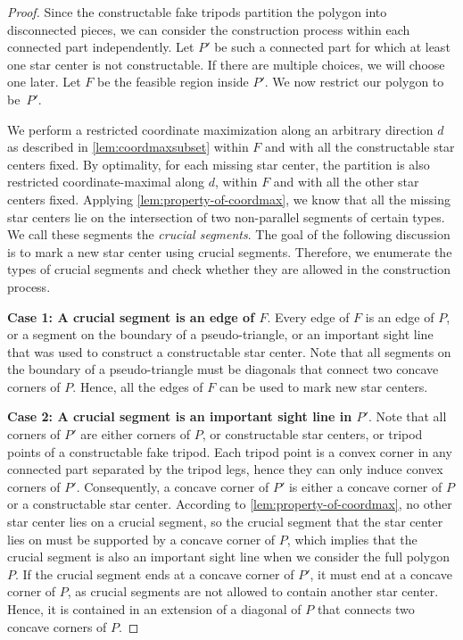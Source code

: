 \documentclass[10pt,a4paper]{article}
\begin{document}
\begin{proof}
Since the constructable fake tripods partition the polygon into disconnected pieces, we can consider the construction process within each connected part independently. Let $P'$ be such a connected part for which at least one star center is not constructable. If there are multiple choices, we will choose one later. Let $F$ be the feasible region inside $P'$. We now restrict our polygon to be~$P'$. 

We perform a restricted coordinate maximization along an arbitrary direction $d$ as described in \cref{lem:coordmaxsubset} within $F$ and with all the constructable star centers fixed. 
By optimality, for each missing star center, the partition is also restricted coordinate-maximal along $d$, within $F$ and with all the other star centers fixed.
Applying \cref{lem:property-of-coordmax}, we know that all the missing star centers lie on the intersection of two non-parallel segments of certain types. 
We call these segments the \emph{crucial segments}.
The goal of the following discussion is to mark
a new star center using crucial segments. 
Therefore, we enumerate the types of crucial segments and check whether they are allowed in the construction process.

\textbf{\boldmath Case 1: A crucial segment is an edge of $F$}.
Every edge of $F$ is an edge of $P$, or a segment on the boundary of a pseudo-triangle, or an important sight line that was used to construct a constructable star center.
Note that all segments on the boundary of a pseudo-triangle must be diagonals that connect two concave corners of $P$. Hence, all the edges of $F$ can be used to mark new star centers. 

\textbf{\boldmath Case 2: A crucial segment is an important sight line in $P'$}.
Note that all corners of $P'$ are either corners of $P$, or constructable star centers, or tripod points of a constructable fake tripod. 
Each tripod point is a convex corner in any connected part separated by the tripod legs, hence they can only induce convex corners of $P'$.
Consequently, a concave corner of $P'$ is either a concave corner of $P$ or a constructable star center.
According to \cref{lem:property-of-coordmax}, no other star center lies on a crucial segment, so the crucial segment that the star center lies on must be supported by a concave corner of $P$, which implies that the crucial segment is also an important sight line when we consider the full polygon $P$. 
If the crucial segment ends at a concave corner of $P'$, it must end at a concave corner of $P$, as crucial segments are not allowed to contain another star center. Hence, it is contained in an extension of a diagonal of $P$ that connects two concave corners of $P$. 


\end{proof}
\end{document}
